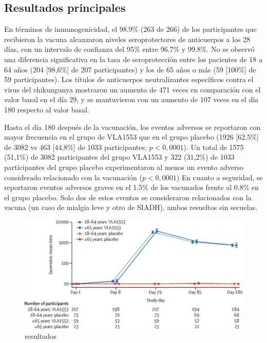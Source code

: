 \documentclass[
]{article}
\begin{document}
\subsection{Resultados principales}\label{resultados-principales}

En términos de inmunogenicidad, el 98.9\% (263 de 266) de los
participantes que recibieron la vacuna alcanzaron niveles
seroprotectores de anticuerpos a los 28 días, con un intervalo de
confianza del 95\% entre 96.7\% y 99.8\%. No se observó una diferencia
significativa en la tasa de seroprotección entre los pacientes de 18 a
64 años (204 {[}98,6\%{]} de 207 participantes) y los de 65 años o más
(59 {[}100\%{]} de 59 participantes). Los títulos de anticuerpos
neutralizantes específicos contra el virus del chikungunya mostraron un
aumento de 471 veces en comparación con el valor basal en el día 29, y
se mantuvieron con un aumento de 107 veces en el día 180 respecto al
valor basal.

Hasta el día 180 después de la vacunación, los eventos adversos se
reportaron con mayor frecuencia en el grupo de VLA1553 que en el grupo
placebo (1926 {[}62,5\%{]} de 3082 vs 463 {[}44,8\%{]} de 1033
participantes; \(p < 0,0001\)). Un total de 1575 (51,1\%) de 3082
participantes del grupo VLA1553 y 322 (31,2\%) de 1033 participantes del
grupo placebo experimentaron al menos un evento adverso considerado
relacionado con la vacunación (\(p < 0,0001\)) En cuanto a seguridad, se
reportaron eventos adversos graves en el 1.5\% de los vacunados frente
al 0.8\% en el grupo placebo. Solo dos de estos eventos se consideraron
relacionados con la vacuna (un caso de mialgia leve y otro de SIADH),
ambos resueltos sin secuelas.

\begin{figure}
\centering
\includegraphics{img/placebo.jpeg}
\caption{resultados}
\end{figure}
\end{document}
